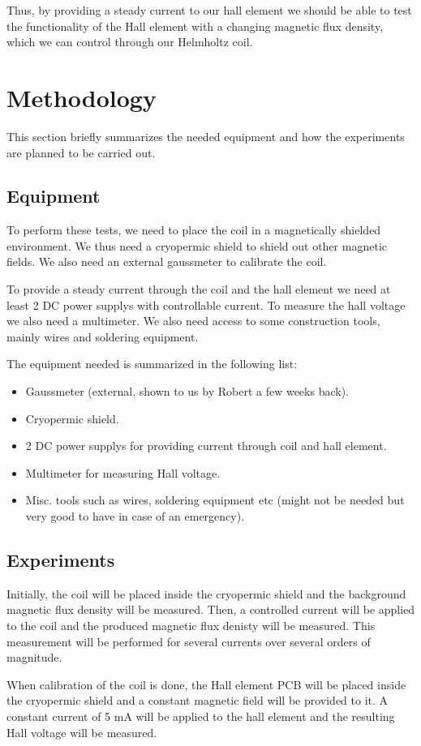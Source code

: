 \documentclass[10pt, a4paper]{article}
\begin{document}
Thus, by providing a steady current to our hall element we should be able to test the functionality of the Hall element with a changing magnetic flux density, which we can control through our Helmholtz coil.
\section{Methodology}
This section briefly summarizes the needed equipment and how the experiments are planned to be carried out.
\subsection{Equipment}
To perform these tests, we need to place the coil in a magnetically shielded environment.
We thus need a cryopermic shield to shield out other magnetic fields. 
We also need an external gaussmeter to calibrate the coil.

To provide a steady current through the coil and the hall element we need at least 2 DC power supplys with controllable current.
To measure the hall voltage we also need a multimeter. 
We also need access to some construction tools, mainly wires and soldering equipment. 

The equipment needed is summarized in the following list:
\begin{itemize}
    \item Gaussmeter (external, shown to us by Robert a few weeks back).
    \item Cryopermic shield.
    \item 2 DC power supplys for providing current through coil and hall element.
    \item Multimeter for measuring Hall voltage.
    \item Misc. tools such as wires, soldering equipment etc (might not be needed but very good to have in case of an emergency). 
\end{itemize}
\subsection{Experiments}
Initially, the coil will be placed inside the cryopermic shield and the background magnetic flux density will be measured.
Then, a controlled current will be applied to the coil and the produced magnetic flux denisty will be measured.
This measurement will be performed for several currents over several orders of magnitude.

When calibration of the coil is done, the Hall element PCB will be placed inside the cryopermic shield and a constant magnetic field will be provided to it.
A constant current of 5 mA will be applied to the hall element and the resulting Hall voltage will be measured.
\end{document}
